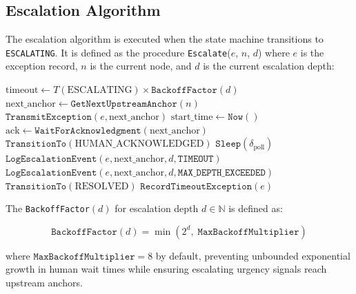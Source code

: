 \subsection{Escalation Algorithm}

The escalation algorithm is executed when the state machine transitions to \texttt{ESCALATING}. It is defined as the procedure \texttt{Escalate}($e$, $n$, $d$) where $e$ is the exception record, $n$ is the current node, and $d$ is the current escalation depth:

\begin{algorithm}
\caption{Escalation Algorithm \texttt{Escalate}}
\label{alg:escalate}
\begin{algorithmic}
    \State $\text{timeout} \leftarrow T(\text{ESCALATING}) \times \texttt{BackoffFactor}(d)$
    \State $\text{next\_anchor} \leftarrow \texttt{GetNextUpstreamAnchor}(n)$
    \State $\texttt{TransmitException}(e, \text{next\_anchor})$
    \State $\text{start\_time} \leftarrow \texttt{Now}()$
        \State $\text{ack} \leftarrow \texttt{WaitForAcknowledgment}(\text{next\_anchor})$
            \State $\texttt{TransitionTo}(\text{HUMAN\_ACKNOWLEDGED})$
            \State \Return
        \EndIf
        \State $\texttt{Sleep}(\delta_{\text{poll}})$
    \EndWhile
        \State $\texttt{LogEscalationEvent}(e, \text{next\_anchor}, d, \texttt{TIMEOUT})$
        \State {}
    \Else
        \State $\texttt{LogEscalationEvent}(e, \text{next\_anchor}, d, \texttt{MAX\_DEPTH\_EXCEEDED})$
        \State $\texttt{TransitionTo}(\text{RESOLVED})$
        \State $\texttt{RecordTimeoutException}(e)$
    \EndIf
\EndFunction
\end{algorithmic}
\end{algorithm}

The \texttt{BackoffFactor}$(d)$ for escalation depth $d \in \mathbb{N}$ is defined as:

\[
\texttt{BackoffFactor}(d) = \min\left(2^d, \; \texttt{MaxBackoffMultiplier}\right)
\]

where $\texttt{MaxBackoffMultiplier} = 8$ by default, preventing unbounded exponential growth in human wait times while ensuring escalating urgency signals reach upstream anchors.

